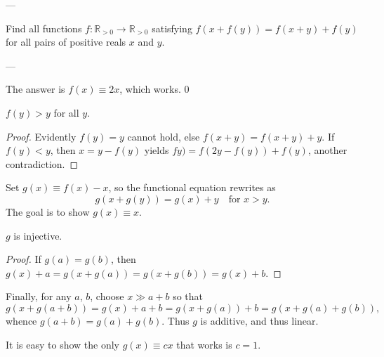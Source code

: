 
---

Find all functions $f:\mathbb R_{>0}\to\mathbb R_{>0}$ satisfying $f(x+f(y))=f(x+y)+f(y)$ for all pairs of positive reals $x$ and $y$.

---

The answer is $f(x)\equiv2x$, which works.
\setcounter{claim}0
\begin{claim}
    $f(y)>y$ for all $y$.
\end{claim}
\begin{proof}
Evidently $f(y)=y$ cannot hold, else $f(x+y)=f(x+y)+y$. If $f(y)<y$, then $x=y-f(y)$ yields $fy)=f(2y-f(y))+f(y)$, another contradiction.
\end{proof}

Set $g(x)\equiv f(x)-x$, so the functional equation rewrites as
\[g(x+g(y))=g(x)+y\quad\text{for }x>y.\]
The goal is to show $g(x)\equiv x$.
\begin{claim}
    $g$ is injective.
\end{claim}
\begin{proof}
    If $g(a)=g(b)$, then $g(x)+a=g(x+g(a))=g(x+g(b))=g(x)+b$.
\end{proof}

Finally, for any $a$, $b$, choose $x\gg a+b$ so that
\[g(x+g(a+b))=g(x)+a+b=g(x+g(a))+b=g(x+g(a)+g(b)),\]
whence $g(a+b)=g(a)+g(b)$. Thus $g$ is additive, and thus linear.

It is easy to show the only $g(x)\equiv cx$ that works is $c=1$.

